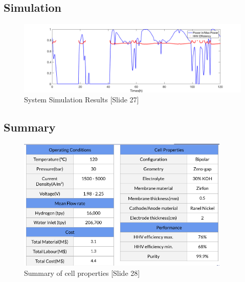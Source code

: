 \subsection{Simulation}
\begin{figure}[H]
\centering
\includegraphics[width=1.0\textwidth]{simulation.png}
\caption{System Simulation Results [Slide 27]} 
\end{figure} 

\subsection{Summary}
\begin{figure}[H]
\includegraphics[width=0.9\textwidth]{summary2.png}
\caption{Summary of cell properties [Slide 28]}
\end{figure} 

